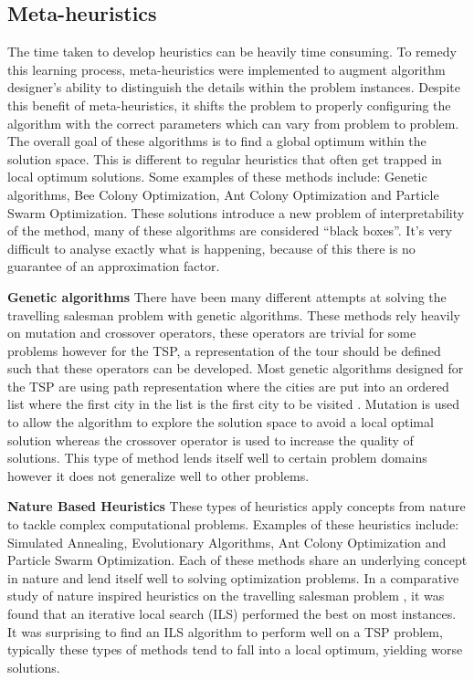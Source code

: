 \documentclass[]{UCD_CS_FYP_Report}
\begin{document}
\newpage
\subsection{Meta-heuristics}
The time taken to develop heuristics can be heavily time consuming. To remedy this learning process, meta-heuristics were implemented to augment algorithm designer’s ability to distinguish the details within the problem instances. Despite this benefit of meta-heuristics, it shifts the problem to properly configuring the algorithm with the correct parameters which can vary from problem to problem. The overall goal of these algorithms is to find a global optimum within the solution space. This is different to regular heuristics that often get trapped in local optimum solutions. Some examples of these methods include: Genetic algorithms, Bee Colony Optimization, Ant Colony Optimization and Particle Swarm Optimization. These solutions introduce a new problem of interpretability of the method, many of these algorithms are considered “black boxes”. It’s very difficult to analyse exactly what is happening, because of this there is no guarantee of an approximation factor.

\textbf{Genetic algorithms}
There have been many different attempts at solving the travelling salesman problem with genetic algorithms. These methods rely heavily on mutation and crossover operators, these operators are trivial for some problems however for the TSP, a representation of the tour should be defined such that these operators can be developed. Most genetic algorithms designed for the TSP are using path representation where the cities are put into an ordered list where the first city in the list is the first city to be visited \cite{Larranaga1999}. Mutation is used to allow the algorithm to explore the solution space to avoid a local optimal solution whereas the crossover operator is used to increase the quality of solutions. This type of method lends itself well to certain problem domains however it does not generalize well to other problems.

\textbf{Nature Based Heuristics}
These types of heuristics apply concepts from nature to tackle complex computational problems. Examples of these heuristics include: Simulated Annealing, Evolutionary Algorithms, Ant Colony Optimization and Particle Swarm Optimization. Each of these methods share an underlying concept in nature and lend itself well to solving optimization problems. In a comparative study of nature inspired heuristics on the travelling salesman problem \cite{NatureBasedHeuristics}, it was found that an iterative local search (ILS) performed the best on most instances. It was surprising to find an ILS algorithm to perform well on a TSP problem, typically these types of methods tend to fall into a local optimum, yielding worse solutions.
\end{document}
